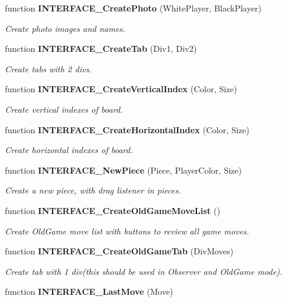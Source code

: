 \begin{CompactItemize}
function {\bf INTERFACE\_\-CreatePhoto} (WhitePlayer, BlackPlayer)
\begin{CompactList}\small\item\em Create photo images and names. \item\end{CompactList}\item 
function {\bf INTERFACE\_\-CreateTab} (Div1, Div2)
\begin{CompactList}\small\item\em Create tabs with 2 divs. \item\end{CompactList}\item 
function {\bf INTERFACE\_\-CreateVerticalIndex} (Color, Size)
\begin{CompactList}\small\item\em Create vertical indexes of board. \item\end{CompactList}\item 
function {\bf INTERFACE\_\-CreateHorizontalIndex} (Color, Size)
\begin{CompactList}\small\item\em Create horizontal indexes of board. \item\end{CompactList}\item 
function {\bf INTERFACE\_\-NewPiece} (Piece, PlayerColor, Size)
\begin{CompactList}\small\item\em Create a new piece, with drag listener in pieces. \item\end{CompactList}\item 
function {\bf INTERFACE\_\-CreateOldGameMoveList} ()
\begin{CompactList}\small\item\em Create OldGame move list with buttons to review all game moves. \item\end{CompactList}\item 
function {\bf INTERFACE\_\-CreateOldGameTab} (DivMoves)
\begin{CompactList}\small\item\em Create tab with 1 div(this should be used in Observer and OldGame mode). \item\end{CompactList}\item 
function {\bf INTERFACE\_\-LastMove} (Move)

\end{CompactItemize}
